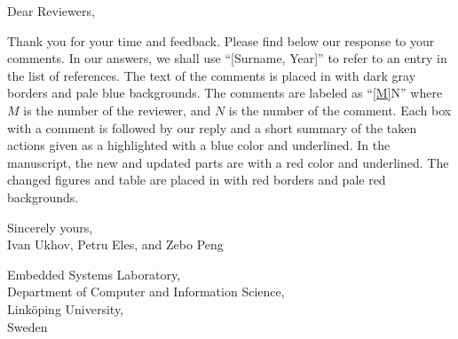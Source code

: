 Dear Reviewers,

\vspace{2em}
\noindent Thank you for your time and feedback. Please find below our response
to your comments. In our answers, we shall use ``[Surname, Year]'' to refer to
an entry in the list of references. The text of the comments is placed in
 with dark gray borders and pale blue backgrounds. The
comments are labeled as ``\cref{M}{N}'' where $M$ is the number of the reviewer,
and $N$ is the number of the comment. Each box with a comment is followed by our
reply and a short summary of the taken actions given as a 
highlighted with a blue color and underlined. In the manuscript, the new and
updated parts are  with a red color and underlined. The changed
figures and table are placed in  with red borders and pale red
backgrounds.

\vspace{2em}
\noindent Sincerely yours,\\
Ivan Ukhov, Petru Eles, and Zebo Peng

\vspace{1em}
\noindent Embedded Systems Laboratory,\\
Department of Computer and Information Science,\\
Link\"{o}ping University,\\
Sweden

$ $
